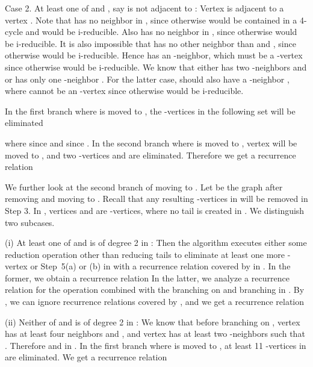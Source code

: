 \documentclass{elsart_TR2}
\begin{document}
Case 2. At least one of  and , say  is not adjacent to :
Vertex  is adjacent to a vertex .
Note that  has no neighbor in ,
since otherwise  would be contained in a 4-cycle and  would be i-reducible.
Also  has no neighbor  in , since otherwise  would be i-reducible.
It is also impossible that  has no other neighbor than  and , since otherwise  would be i-reducible.
Hence   has an -neighbor, which must be
a -vertex since otherwise  would be i-reducible.
We know that either  has two -neighbors  and  or  has only one -neighbor .
For the latter case,  should also have a -neighbor ,
where  cannot be an -vertex since otherwise  would be i-reducible.


In the first branch where  is moved to , the -vertices in the following set will be eliminated

where  since  and  since .
In the second branch where  is moved to , vertex  will be moved to , and
two -vertices  and  are  eliminated.
Therefore we get a recurrence relation


We further look at the second branch of moving  to .
Let  be the graph after removing  and moving  to .
Recall that any resulting -vertices in   will be removed in Step 3.
In , vertices  and  are  -vertices, where no tail is created in .
We distinguish two subcases.

(i) At least one of  and  is of degree 2 in :
Then the algorithm executes either
 some reduction operation other than reducing tails
to eliminate at least one more -vertex
or   Step~5(a) or  (b) in 
with a recurrence relation covered by  in .
In the former, we obtain a recurrence relation
In the latter, we analyze a recurrence relation for the operation combined with
the branching on  and branching in .
By ,
we can ignore recurrence relations covered by ,
and   we get a recurrence relation



(ii) Neither of  and  is of degree 2 in :
We know that before branching on ,
vertex  has at least four neighbors  and ,
and vertex  has at least two -neighbors  such that .
 Therefore  and  in .
In the first branch where  is moved to ,
at least 11 -vertices in  are eliminated.
We get a recurrence relation
\end{document}
